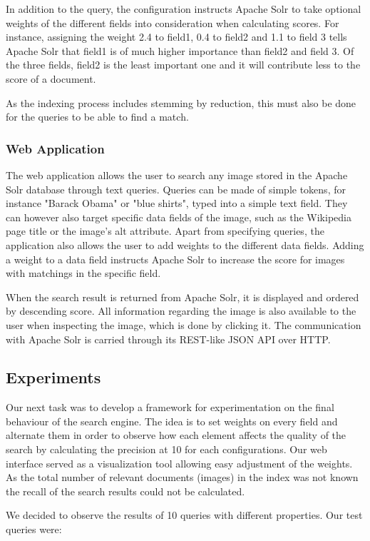 \documentclass[a4paper]{article}
\begin{document}
In addition to the query, the configuration instructs Apache Solr to take optional weights of the different fields into consideration when calculating scores. For instance, assigning the weight 2.4 to field1, 0.4 to field2 and 1.1 to field 3 tells Apache Solr that field1 is of much higher importance than field2 and field 3. Of the three fields, field2 is the least important one and it will contribute less to the score of a document.

As the indexing process includes stemming by reduction, this must also be done for the queries to be able to find a match.

\subsubsection{Web Application}
The web application allows the user to search any image stored in the Apache Solr database through text queries. Queries can be made of simple tokens, for instance "Barack Obama" or "blue shirts", typed into a simple text field. They can however also target specific data fields of the image, such as the Wikipedia page title or the image's alt attribute. Apart from specifying queries, the application also allows the user to add weights to the different data fields. Adding a weight to a data field instructs Apache Solr to increase the score for images with matchings in the specific field. 

When the search result is returned from Apache Solr, it is displayed and ordered by descending score. All information regarding the image is also available to the user when inspecting the image, which is done by clicking it. The communication with Apache Solr is carried through its REST-like JSON API over HTTP.

\subsection{Experiments}
Our next task was to develop a framework for experimentation on the final behaviour of the search engine. The idea is to set weights on every field and alternate them in order to observe how each element affects the quality of the search by calculating the precision at 10 for each configurations. Our web interface served as a visualization tool allowing easy adjustment of the weights. As the total number of relevant documents (images) in the index was not known the recall of the search results could not be calculated.

We decided to observe the results of 10 queries with different properties. Our test queries were:
\end{document}
